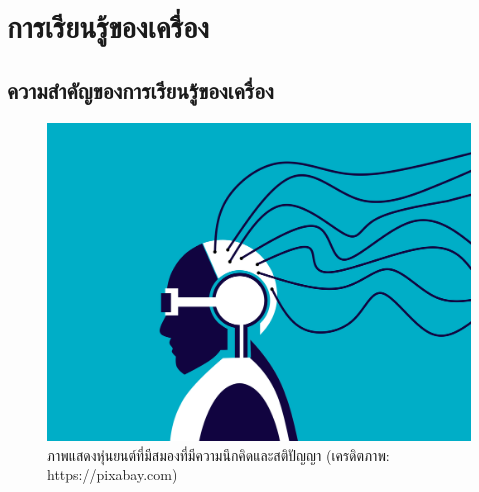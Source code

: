 

\chapter{การเรียนรู้ของเครื่อง}
\label{ch:ml}


\section{ความสำคัญของการเรียนรู้ของเครื่อง}
\label{sec:why_ml}

\begin{figure}[H]
    \centering
    \includegraphics[width=0.8\linewidth]{fig/cyborg.png}
    \caption{ภาพแสดงหุ่นยนต์ที่มีสมองที่มีความนึกคิดและสติปัญญา (เครดิตภาพ: https://pixabay.com)}
    \label{fig:cyborg}
\end{figure}

